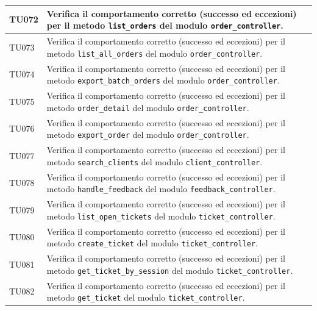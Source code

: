 \documentclass[a4paper,11pt,oneside]{scrartcl}
\begin{document}
\begin{longtable}{|p{1.9cm}|p{11.6cm}|c|}
    TU072           & Verifica il comportamento corretto (successo ed eccezioni) per il metodo \texttt{list\_orders} del modulo \texttt{order\_controller}.                        &                \\ \hline
    TU073           & Verifica il comportamento corretto (successo ed eccezioni) per il metodo \texttt{list\_all\_orders} del modulo \texttt{order\_controller}.                   &                \\ \hline
    TU074           & Verifica il comportamento corretto (successo ed eccezioni) per il metodo \texttt{export\_batch\_orders} del modulo \texttt{order\_controller}.               &                \\ \hline
    TU075           & Verifica il comportamento corretto (successo ed eccezioni) per il metodo \texttt{order\_detail} del modulo \texttt{order\_controller}.                       &                \\ \hline
    TU076           & Verifica il comportamento corretto (successo ed eccezioni) per il metodo \texttt{export\_order} del modulo \texttt{order\_controller}.                       &                \\ \hline
    TU077           & Verifica il comportamento corretto (successo ed eccezioni) per il metodo \texttt{search\_clients} del modulo \texttt{client\_controller}.                    &                \\ \hline
    TU078           & Verifica il comportamento corretto (successo ed eccezioni) per il metodo \texttt{handle\_feedback} del modulo \texttt{feedback\_controller}.                 &                \\ \hline
    TU079           & Verifica il comportamento corretto (successo ed eccezioni) per il metodo \texttt{list\_open\_tickets} del modulo \texttt{ticket\_controller}.                &                \\ \hline
    TU080           & Verifica il comportamento corretto (successo ed eccezioni) per il metodo \texttt{create\_ticket} del modulo \texttt{ticket\_controller}.                     &                \\ \hline
    TU081           & Verifica il comportamento corretto (successo ed eccezioni) per il metodo \texttt{get\_ticket\_by\_session} del modulo \texttt{ticket\_controller}.           &                \\ \hline
    TU082           & Verifica il comportamento corretto (successo ed eccezioni) per il metodo \texttt{get\_ticket} del modulo \texttt{ticket\_controller}.                        &                \\ \hline

\end{longtable}
\end{document}
